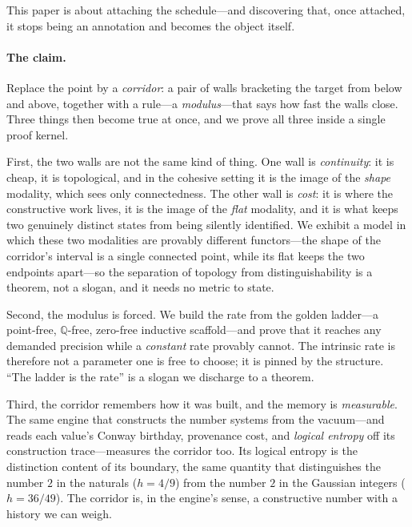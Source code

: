 \documentclass[11pt,letterpaper]{article}
\theoremstyle{plain}
\theoremstyle{definition}
\theoremstyle{remark}
\newcommand{\QQ}{\mathbb{Q}}
\begin{document}
This paper is about attaching the schedule---and discovering that, once attached,
it stops being an annotation and becomes the object itself.

\paragraph{The claim.}
Replace the point by a \emph{corridor}: a pair of walls bracketing the target
from below and above, together with a rule---a \emph{modulus}---that says how fast
the walls close. Three things then become true at once, and we prove all three
inside a single proof kernel.

First, the two walls are not the same kind of thing. One wall is
\emph{continuity}: it is cheap, it is topological, and in the cohesive setting it
is the image of the \emph{shape} modality, which sees only connectedness. The
other wall is \emph{cost}: it is where the constructive work lives, it is the
image of the \emph{flat} modality, and it is what keeps two genuinely distinct
states from being silently identified. We exhibit a model in which these two
modalities are provably different functors---the shape of the corridor's interval
is a single connected point, while its flat keeps the two endpoints apart---so the
separation of topology from distinguishability is a theorem, not a slogan, and it
needs no metric to state.

Second, the modulus is forced. We build the rate from the golden ladder---a
point-free, $\QQ$-free, zero-free inductive scaffold---and prove that it reaches
any demanded precision while a \emph{constant} rate provably cannot. The
intrinsic rate is therefore not a parameter one is free to choose; it is pinned by
the structure. ``The ladder is the rate'' is a slogan we discharge to a theorem.

Third, the corridor remembers how it was built, and the memory is
\emph{measurable}. The same engine that constructs the number systems from the
vacuum---and reads each value's Conway birthday, provenance cost, and
\emph{logical entropy} off its construction trace---measures the corridor too. Its
logical entropy is the distinction content of its boundary, the same quantity that
distinguishes the number $2$ in the naturals ($h=4/9$) from the number $2$ in the
Gaussian integers ($h=36/49$). The corridor is, in the engine's sense, a
constructive number with a history we can weigh.
\end{document}
